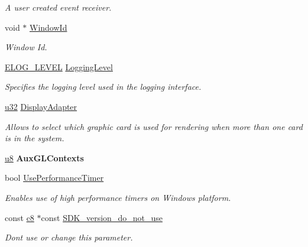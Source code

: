 \begin{DoxyCompactItemize}
\begin{DoxyCompactList}\small\item\em A user created event receiver. \end{DoxyCompactList}\item 
void $\ast$ \hyperlink{structirr_1_1SIrrlichtCreationParameters_af287810d910a23f8f7db98cef87b6eae}{Window\+Id}
\begin{DoxyCompactList}\small\item\em Window Id. \end{DoxyCompactList}\item 
\hyperlink{namespaceirr_aa2d1cac68606a25ed24cfffccfa30a92}{E\+L\+O\+G\+\_\+\+L\+E\+V\+EL} \hyperlink{structirr_1_1SIrrlichtCreationParameters_a2aa305ffabdd842084ddef5014b3e411}{Logging\+Level}
\begin{DoxyCompactList}\small\item\em Specifies the logging level used in the logging interface. \end{DoxyCompactList}\item 
\hyperlink{namespaceirr_a0416a53257075833e7002efd0a18e804}{u32} \hyperlink{structirr_1_1SIrrlichtCreationParameters_aa58e8699007135f9d950712f96fab730}{Display\+Adapter}
\begin{DoxyCompactList}\small\item\em Allows to select which graphic card is used for rendering when more than one card is in the system. \end{DoxyCompactList}\item 
\hyperlink{namespaceirr_a646874f69af8ff87fc10201b0254a761}{u8} {\bfseries Aux\+G\+L\+Contexts}\hypertarget{structirr_1_1SIrrlichtCreationParameters_acf8736b2823d990a889ea2b2240027c6}{}\label{structirr_1_1SIrrlichtCreationParameters_acf8736b2823d990a889ea2b2240027c6}

\item 
bool \hyperlink{structirr_1_1SIrrlichtCreationParameters_a5bb2ea5e72eb07a049b1b7c707f405ef}{Use\+Performance\+Timer}
\begin{DoxyCompactList}\small\item\em Enables use of high performance timers on Windows platform. \end{DoxyCompactList}\item 
const \hyperlink{namespaceirr_a9395eaea339bcb546b319e9c96bf7410}{c8} $\ast$const \hyperlink{structirr_1_1SIrrlichtCreationParameters_af30f104af135b97d3e19fecaf2c10e45}{S\+D\+K\+\_\+version\+\_\+do\+\_\+not\+\_\+use}
\begin{DoxyCompactList}\small\item\em Don\textquotesingle{}t use or change this parameter. \end{DoxyCompactList}\end{DoxyCompactItemize}


